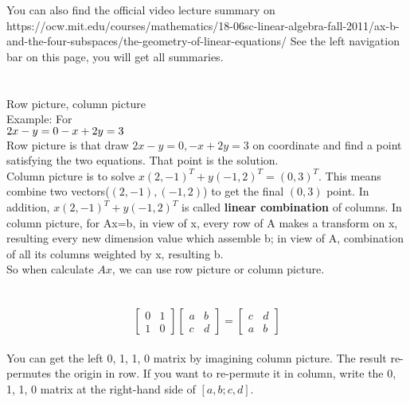\documentclass{article}
\begin{document}
\begin{spacing}{1.5}

You can also find the official video lecture summary on https://ocw.mit.edu/courses/mathematics/18-06sc-linear-algebra-fall-2011/ax-b-and-the-four-subspaces/the-geometry-of-linear-equations/  \qquad See the left navigation bar on this page, you will get all summaries.

\section{}
Row picture, column picture\\
Example: For\\
	$2x-y=0\\
	-x+2y=3$ \\
Row picture is that draw $2x-y=0, -x+2y=3$ on coordinate and find a point satisfying the two equations. That point is the solution.\\
Column picture is to solve $x(2, -1)^T + y(-1, 2)^T = (0, 3)^T$. This means combine two vectors($(2, -1), (-1, 2)$) to get the final $(0,3)$ point. In addition, $x(2, -1)^T + y(-1, 2)^T$ is called {\bfseries linear combination} of columns. In column picture, for Ax=b, in view of x, every row of A makes a transform on x, resulting every new dimension value which assemble b; in view of A, combination of all its columns weighted by x, resulting b. \\
So when calculate $Ax$, we can use row picture or column picture. 


\section{}
$$
\begin{bmatrix}
0 & 1 \\
1 & 0 
\end{bmatrix}
\begin{bmatrix}
a & b\\
c & d
\end{bmatrix}
=
\begin{bmatrix}
c & d \\
a & b
\end{bmatrix}
$$ \\
You can get the left 0, 1, 1, 0 matrix by imagining column picture.
The result re-permutes the origin in row. If you want to re-permute it in column, write the 0, 1, 1, 0 matrix at the right-hand side of $[a, b; c, d]$.



\end{spacing}
\end{document}
